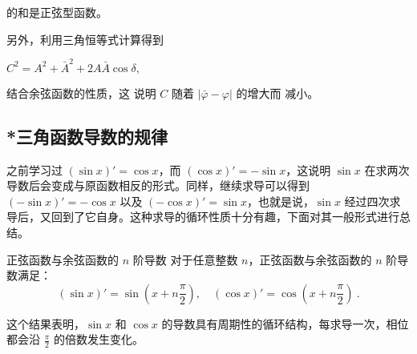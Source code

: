 的和是正弦型函数。

另外，利用三角恒等式计算得到

$C^2=A^2+\bar A^2+2A\bar A\cos\delta,$ 

结合余弦函数的性质，这 说明 $C$ 随着 $\left|\bar\varphi-\varphi\right|$ 的增大而 减小。


\subsection{*三角函数导数的规律}

之前学习过 $(\sin x)' = \cos x$，而 $(\cos x)' = -\sin x$，这说明 $\sin x$ 在求两次导数后会变成与原函数相反的形式。同样，继续求导可以得到 $(-\sin x)' = -\cos x$ 以及 $(-\cos x)' = \sin x$，也就是说，$\sin x$ 经过四次求导后，又回到了它自身。这种求导的循环性质十分有趣，下面对其一般形式进行总结。

\begin{corollary}{正弦函数与余弦函数的 $n$ 阶导数}
对于任意整数 $n$，正弦函数与余弦函数的 $n$ 阶导数满足：
\begin{equation}
(\sin x)' = \sin\left(x + n\frac{\pi}{2}\right), \quad
(\cos x)'= \cos\left(x + n\frac{\pi}{2}\right)~.
\end{equation}
\end{corollary}

这个结果表明，$\sin x$ 和 $\cos x$ 的导数具有周期性的循环结构，每求导一次，相位都会沿 $\frac{\pi}{2}$ 的倍数发生变化。
